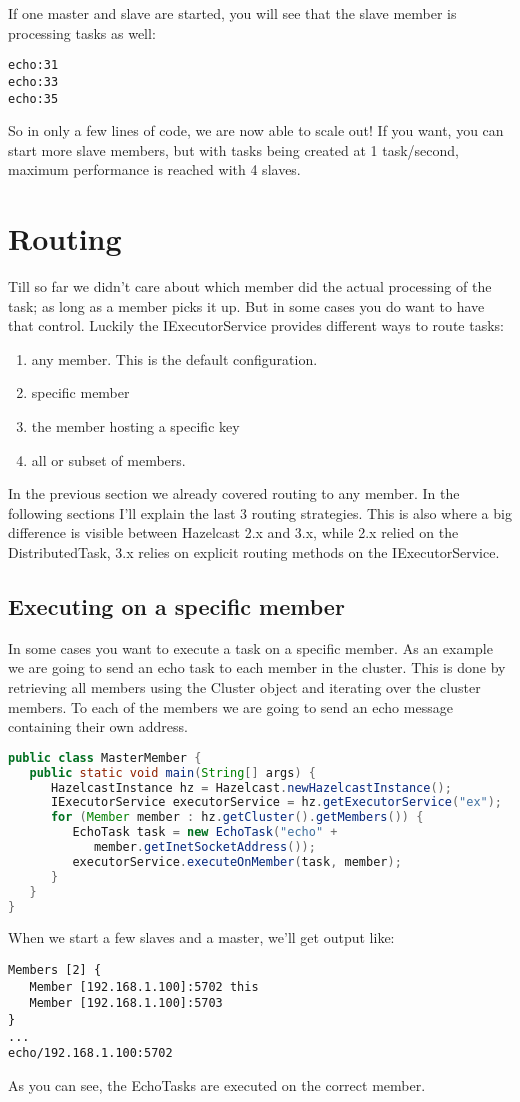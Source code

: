 If one master and slave are started, you will see that the slave member is processing tasks as well:
\begin{lstlisting}
echo:31
echo:33
echo:35	
\end{lstlisting}
So in only a few lines of code, we are now able to scale out! If you want, you can start more slave members, but with tasks being created at 1 task/second, maximum performance is reached with 4 slaves.

\section{Routing}
Till so far we didn't care about which member did the actual processing of the task; as long as a member picks it up. But in some cases you do want to have that control. Luckily the IExecutorService provides different ways to route tasks:
\begin{enumerate}
\item any member. This is the default configuration.
\item specific member
\item the member hosting a specific key
\item all or subset of members.
\end{enumerate}
In the previous section we already covered routing to any member. In the following sections I'll explain the last 3 routing strategies. This is also where a big difference is visible between Hazelcast 2.x and 3.x, while 2.x relied on the DistributedTask, 3.x relies on explicit routing methods on the IExecutorService. 

\subsection{Executing on a specific member}
In some cases you want to execute a task on a specific member. As an example we are going to send an echo task to each member in the cluster. This is done by retrieving all members using the Cluster object and iterating over the cluster members. To each of the members we are going to send an echo message containing their own address. 
\begin{lstlisting}[language=java]
public class MasterMember {
   public static void main(String[] args) {
      HazelcastInstance hz = Hazelcast.newHazelcastInstance();
      IExecutorService executorService = hz.getExecutorService("ex");
      for (Member member : hz.getCluster().getMembers()) {
         EchoTask task = new EchoTask("echo" + 
            member.getInetSocketAddress());
         executorService.executeOnMember(task, member);
      }
   }
}
\end{lstlisting}
When we start a few slaves and a master, we'll get output like:
\begin{lstlisting}
Members [2] {
   Member [192.168.1.100]:5702 this
   Member [192.168.1.100]:5703
}
...
echo/192.168.1.100:5702
\end{lstlisting}
As you can see, the EchoTasks are executed on the correct member.

